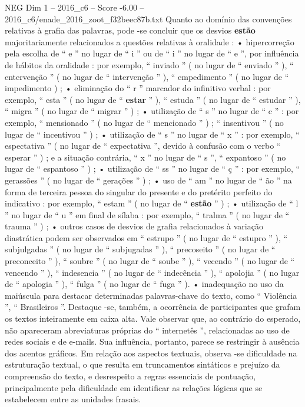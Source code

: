 \begin{textsample}{NEG Dim 1 – 2016\_c6 – Score -6.00 – 2016\_c6/enade\_2016\_zoot\_f32beec87b.txt}
Quanto ao domínio das convenções relativas à grafia das palavras, pode -se concluir que os desvios \textbf{estão} majoritariamente relacionados a questões relativas à oralidade : • hipercorreção pela escolha de “ e ” no lugar de “ i ” ou de “ i ” no lugar de “ e ”, por influência de hábitos da oralidade : por exemplo, “ inviado ” ( no lugar de “ enviado ” ), “ entervenção ” ( no lugar de “ intervenção ” ), “ empedimento ” ( no lugar de “ impedimento ) ; • eliminação do “ r ” marcador do infinitivo verbal : por exemplo, “ esta ” ( no lugar de “ \textbf{estar} ” ), “ estuda ” ( no lugar de “ estudar ” ), “ migra ” ( no lugar de “ migrar ” ) ; • utilização de “ s ” no lugar de “ c ” : por exemplo, “ mensionado ” ( no lugar de “ mencionado ” ) ; “ insentivou ” ( no lugar de “ incentivou ” ) ; • utilização de “ s ” no lugar de “ x ” : por exemplo, “ espectativa ” ( no lugar de “ expectativa ”, devido à confusão com o verbo “ esperar ” ) ; e a situação contrária, “ x ” no lugar de “ s ”, “ expantoso ” ( no lugar de “ espantoso ” ) ; • utilização de “ ss ” no lugar de “ ç ” : por exemplo, “ gerassões ” ( no lugar de “ gerações ” ) ; • uso de “ am ” no lugar de “ ão ” na forma de terceira pessoa do singular do presente e do pretérito perfeito do indicativo : por exemplo, “ estam ” ( no lugar de “ \textbf{estão} ” ) ; • utilização de “ l ” no lugar de “ u ” em final de sílaba : por exemplo, “ tralma ” ( no lugar de “ trauma ” ) ; • outros casos de desvios de grafia relacionados à variação diastrática podem ser observados em “ estrupo ” ( no lugar de “ estupro ” ), “ subjulgadas ” ( no lugar de “ subjugadas ” ), “ precoseito ” ( no lugar de “ preconceito ” ), “ soubre ” ( no lugar de “ soube ” ), “ vecendo ” ( no lugar de “ vencendo ” ), “ indesencia ” ( no lugar de “ indecência ” ), “ apolojia ” ( no lugar de “ apologia ” ), “ fulga ” ( no lugar de “ fuga ” ). • inadequação no uso da maiúscula para destacar determinadas palavras-chave do texto, como “ Violência ”, “ Brasileiros ”.
Destaque -se, também, a ocorrência de participantes que grafam os textos inteiramente em caixa alta.
Vale observar que, ao contrário do esperado, não apareceram abreviaturas próprias do “ internetês ”, relacionadas ao uso de redes sociais e de e-mails.
Sua influência, portanto, parece se restringir à ausência dos acentos gráficos.
Em relação aos aspectos textuais, observa -se dificuldade na estruturação textual, o que resulta em truncamentos sintáticos e prejuízo da compreensão do texto, e desrespeito a regras essenciais de pontuação, principalmente pela dificuldade em identificar as relações lógicas que se estabelecem entre as unidades frasais.

\end{textsample}
